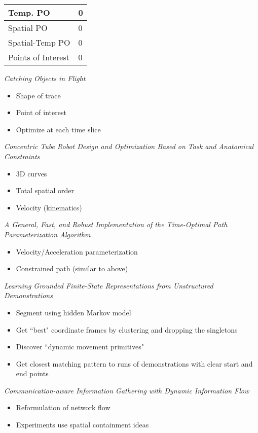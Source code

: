 \documentclass[12pt]{article}
\begin{document}
\begin{table}[h]
\begin{tabular}{|l|l|}
\hline
Temp. PO &  0\\ \hline
Spatial PO & 0  \\ \hline
Spatial-Temp PO & 0 \\ \hline
Points of Interest & 0 \\ \hline
\end{tabular}
\end{table}

{\sl Catching Objects in Flight}
\cite{kim2014catching}
\begin{itemize}
  \item Shape of trace
  \item Point of interest
  \item Optimize at each time slice
\end{itemize}

{\sl Concentric Tube Robot Design and Optimization
Based on Task and Anatomical Constraints}
\cite{bergelesconcentric}
\begin{itemize}
  \item 3D curves
  \item Total spatial order
  \item Velocity (kinematics)
\end{itemize}

{\sl A General, Fast, and Robust Implementation of the
Time-Optimal Path Parameterization Algorithm}
\cite{pham2014general}
\begin{itemize}
  \item Velocity/Acceleration parameterization
  \item Constrained path (similar to above)
\end{itemize}

{\sl Learning Grounded Finite-State Representations
from Unstructured Demonstrations}
\cite{niekum2014learning}
\begin{itemize}
  \item Segment using hidden Markov model
  \item Get ``best" coordinate frames by clustering
        and dropping the singletons
  \item Discover ``dynamic movement primitives"
  \item Get closest matching pattern to runs of
        demonstrations with clear start and end points
\end{itemize}

{\sl Communication-aware Information Gathering with
Dynamic Information Flow}
\cite{kassir2014communication}
\begin{itemize}
  \item Reformulation of network flow
  \item Experiments use spatial containment ideas
\end{itemize}



\end{document}
